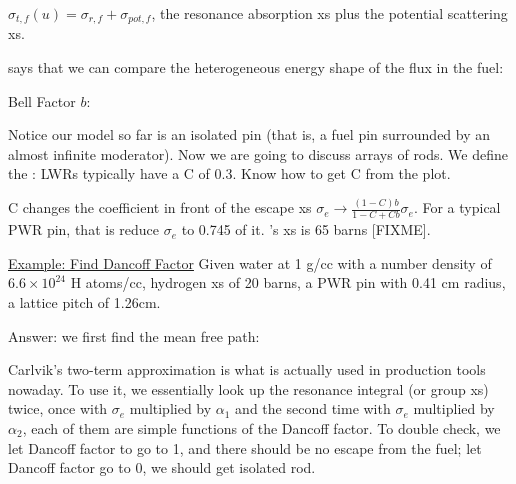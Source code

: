 \documentclass{school-22.211-notes}
\begin{document}





$\sigma_{t,f}(u) = \sigma_{r,f} + \sigma_{pot, f}$, the resonance absorption xs plus the potential scattering xs. 


 says that we can compare the heterogeneous energy shape of the flux in the fuel: 


Bell Factor $b$:


Notice our model so far is an isolated pin (that is, a fuel pin surrounded by an almost infinite moderator). Now we are going to discuss arrays of rods. We define the :
LWRs typically have a C of 0.3. Know how to get C from the plot. 


C changes the coefficient in front of the escape xs $\sigma_e \to \frac{(1-C)b}{1-C + Cb} \sigma_e$. For a typical PWR pin, that is reduce $\sigma_e$ to 0.745 of it. 's xs is 65 barns [FIXME].

\uline{Example: Find Dancoff Factor} Given water at 1 g/cc with a number density of $6.6 \times 10^{24}$ H atoms/cc, hydrogen xs of 20 barns, a PWR pin with 0.41 cm radius, a lattice pitch of 1.26cm. 

Answer: we first find the mean free path: 



Carlvik's two-term approximation is what is actually used in production tools nowaday. To use it, we essentially look up the resonance integral (or group xs) twice, once with $\sigma_e$ multiplied by $\alpha_1$ and the second time with $\sigma_e$ multiplied by $\alpha_2$, each of them are simple functions of the Dancoff factor. To double check, we let Dancoff factor to go to 1, and there should be no escape from the fuel; let Dancoff factor go to 0, we should get isolated rod. 
\end{document}
